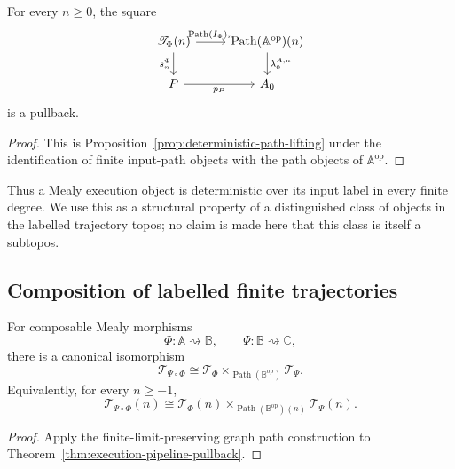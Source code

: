 \begin{corollary}
\label{cor:trajectory-lifting-pullback}
For every \(n\geq0\), the square
\[
\begin{tikzcd}
    \mathscr T_\Phi(n)
        \arrow[r, "{\operatorname{Path}(I_\Phi)_n}"]
        \arrow[d, "s_n^\Phi"']
    &
    \operatorname{Path}(\mathbb A^{\mathrm{op}})(n)
        \arrow[d, "{\lambda_0^{A,n}}"]
    \\
    P
        \arrow[r, "p_P"']
    &
    A_0
\end{tikzcd}
\]
is a pullback.
\end{corollary}

\begin{proof}
This is Proposition~\ref{prop:deterministic-path-lifting} under the
identification of finite input-path objects with the path objects of
\(\mathbb A^{\mathrm{op}}\).
\end{proof}

Thus a Mealy execution object is deterministic over its input label in every
finite degree. We use this as a structural property of a distinguished class
of objects in the labelled trajectory topos; no claim is made here that this
class is itself a subtopos.

\subsection{Composition of labelled finite trajectories}
\label{subsec:composition-trajectory-spans}

\begin{theorem}
\label{thm:composition-labelled-finite-trajectories}
For composable Mealy morphisms
\[
    \Phi:\mathbb A\rightsquigarrow\mathbb B,
    \qquad
    \Psi:\mathbb B\rightsquigarrow\mathbb C,
\]
there is a canonical isomorphism
\[
    \mathscr T_{\Psi\circ\Phi}
    \cong
    \mathscr T_\Phi
    \times_{\operatorname{Path}(\mathbb B^{\mathrm{op}})}
    \mathscr T_\Psi.
\]
Equivalently, for every \(n\geq-1\),
\[
    \mathscr T_{\Psi\circ\Phi}(n)
    \cong
    \mathscr T_\Phi(n)
    \times_{\operatorname{Path}(\mathbb B^{\mathrm{op}})(n)}
    \mathscr T_\Psi(n).
\]
\end{theorem}

\begin{proof}
Apply the finite-limit-preserving graph path construction to
Theorem~\ref{thm:execution-pipeline-pullback}.
\end{proof}

